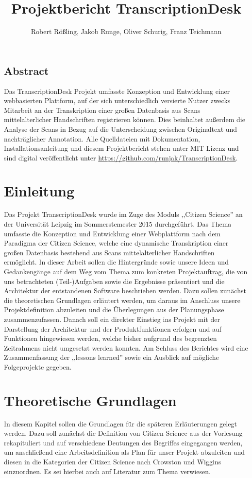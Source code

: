 \documentclass{article}
\title{Projektbericht TranscriptionDesk}
\author{Robert Rößling, Jakob Runge, Oliver Schurig, Franz Teichmann}
\begin{document}
\maketitle

\subsection*{Abstract}
Das TranscriptionDesk Projekt umfasste Konzeption und Entwicklung einer webbasierten Plattform,
auf der sich unterschiedlich versierte Nutzer zwecks Mitarbeit an der Transkription
einer großen Datenbasis aus Scans mittelalterlicher Handschriften registrieren können.
Dies beinhaltet außerdem die Analyse der Scans in Bezug auf die Unterscheidung zwischen Originaltext und nachträglicher Annotation.
Alle Quelldateien mit Dokumentation, Installationsanleitung und diesem Projektbericht
stehen unter MIT Lizenz und sind digital veröffentlicht unter \url{https://github.com/runjak/TranscriptionDesk}.

\tableofcontents
\newpage

\section{Einleitung}
Das Projekt TranscriptionDesk wurde im Zuge des Moduls ,,Citizen Science'' an der Universität Leipzig im Sommerstemester 2015 durchgeführt.
Das Thema umfasste die Konzeption und Entwicklung einer Webplattform nach dem Paradigma der Citizen Science,
welche eine dynamische Transkription einer großen Datenbasis bestehend aus Scans mittelalterlicher Handschriften ermöglicht.
In dieser Arbeit sollen die Hintergründe sowie unsere Ideen und Gedankengänge auf dem Weg vom Thema zum konkreten Projektauftrag,
die von uns betrachteten (Teil-)Aufgaben sowie die Ergebnisse präsentiert
und die Architektur der entstandenen Software beschrieben werden.
Dazu sollen zunächst die theoretischen Grundlagen erläutert werden,
um daraus im Anschluss unsere Projektdefinition abzuleiten und
die Überlegungen aus der Planungsphase zusammenzufassen.
Danach soll ein direkter Einstieg ins Projekt mit der Darstellung der Architektur und der Produktfunktionen erfolgen und auf Funktionen hingewiesen werden,
welche bisher aufgrund des begrenzten Zeitrahmens nicht umgesetzt werden konnten.
Am Schluss des Berichtes wird eine Zusammenfassung der ,,lessons learned'' sowie ein Ausblick auf mögliche Folgeprojekte gegeben.

\section{Theoretische Grundlagen}
In diesem Kapitel sollen die Grundlagen für die späteren Erläuterungen gelegt werden.
Dazu soll zunächst die Definition von Citizen Science aus der Vorlesung rekapituliert und auf verschiedene Deutungen des Begriffes eingegangen werden, um anschließend eine Arbeitsdefinition als Plan für unser Projekt abzuleiten und diesen in die Kategorien der Citizen Science nach Crowston und Wiggins einzuordnen.
Es sei hierbei auch auf Literatur zum Thema verwiesen.
\end{document}
